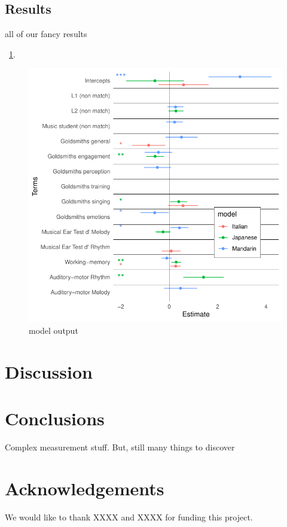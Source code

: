 \documentclass[a4paper]{article}
\begin{document}
\subsection{Results}

all of our fancy results

~\ref{fig:model}.

\begin{figure}[t]
  \centering
  \includegraphics[width=\linewidth]{SP_24_visuals/Japanese,Italian,_Mandarin_max_models_structure:_parsimonious_effects.pdf}
  \caption{model output}
  \label{fig:model}
\end{figure}

\section{Discussion}

\section{Conclusions}

Complex measurement stuff. But, still many things to discover

\section{Acknowledgements}

We would like to thank XXXX and XXXX for funding this project. \\




\end{document}
